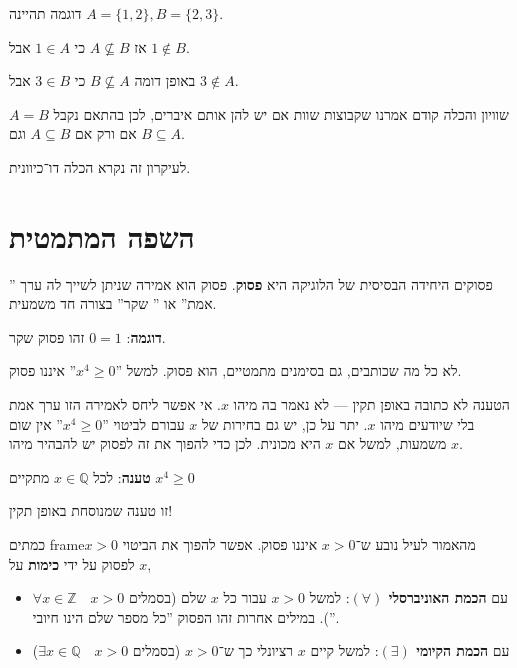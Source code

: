 \documentclass[aspectratio=169]{beamer}
\begin{document}
\begin{frame}{דוגמה}
	תהיינה $A=\{1,2\},B=\{2,3\}$.

	אז $A\not\subseteq B$ כי $1\in A$ אבל $1 \notin B$.

	באופן דומה $B\not\subseteq A$ כי $3\in B$ אבל $3\notin A$.
\end{frame}


\begin{frame}{שוויון והכלה}
	קודם אמרנו שקבוצות שוות אם יש להן אותם איברים, לכן בהתאם נקבל $A = B$ אם ורק אם $A \subseteq B$ וגם $B \subseteq A$.

	לעיקרון זה נקרא הכלה דו־כיוונית.
\end{frame}

\section{השפה המתמטית}

\begin{frame}{פסוקים}
	היחידה הבסיסית של הלוגיקה היא \textbf{פסוק}. פסוק הוא אמירה שניתן
	לשייך לה ערך '' אמת'' או '' שקר''{}
	בצורה חד משמעית. 

	\textbf{דוגמה}: $0=1$ זהו פסוק שקר.

	לא כל מה שכותבים, גם בסימנים מתמטיים, הוא פסוק. למשל ''$x^{4}\ge0$'' איננו פסוק.

	הטענה לא כתובה באופן תקין --- לא נאמר בה מיהו $x$. אי אפשר ליחס לאמירה הזו ערך אמת בלי שיודעים מיהו $x$. יתר על כן, יש גם בחירות של $x$ עבורם לביטוי ''$x^{4}\ge0$'' אין שום משמעות,
	למשל אם $x$ היא מכונית. לכן כדי להפוך את זה לפסוק יש להבהיר מיהו $x$.

	\textbf{טענה}: לכל $x\in\mathbb{Q}$ מתקיים $x^{4}\ge0$

	זו טענה שמנוסחת באופן תקין!
\end{frame}

\begin{frame}{כמתים}
frameמהאמור לעיל נובע ש־$x>0$ איננו פסוק. אפשר להפוך את הביטוי $x>0$
	לפסוק על ידי \textbf{כימות} על $x$, 
	\begin{itemize}
		\item עם \textbf{הכמת האוניברסלי $\left(\forall \right)$}: למשל $x>0$ עבור כל $x$ שלם (בסמלים  $\forall x\in\mathbb{Z}\quad x>0$). 
			במילים אחרות זהו הפסוק ”כל מספר שלם הינו חיובי''.
		\item עם\textbf{ הכמת הקיומי $\left(\exists \right)$}: למשל  קיים $x$
			רציונלי כך ש־$x>0$ (בסמלים  $\exists x\in\mathbb{Q}\quad x>0$)
	\end{itemize}
\end{frame}
\end{document}

